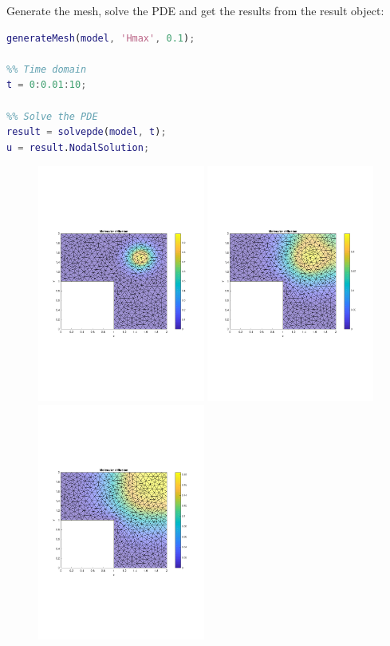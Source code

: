 \documentclass[11pt, a4paper]{article}
\begin{document}
Generate the mesh, solve the PDE and get the results from the result object:
\begin{lstlisting}[language=Matlab]
%% Generate mesh.
generateMesh(model, 'Hmax', 0.1);

%% Time domain
t = 0:0.01:10;

%% Solve the PDE
result = solvepde(model, t);
u = result.NodalSolution;
\end{lstlisting}

\begin{figure}
  \includegraphics[width=0.49\textwidth]{assets/sol_t0_0090.pdf}
  \includegraphics[width=0.49\textwidth]{assets/sol_t1_0090.pdf}
  \includegraphics[width=0.49\textwidth]{assets/sol_t2_0090.pdf}

\end{figure}
\end{document}
